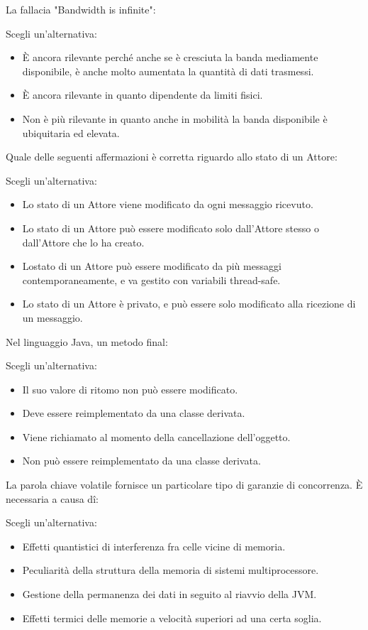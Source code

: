 \documentclass{article}
\begin{document}
La fallacia "Bandwidth is infinite":

Scegli un'alternativa: 

\begin{itemize}
	\item \checkmark È ancora rilevante perché anche se è cresciuta la banda mediamente disponibile, è anche molto aumentata la quantità di dati trasmessi.
	\item È ancora rilevante in quanto dipendente da limiti fisici.
	\item Non è più rilevante in quanto anche in mobilità la banda disponibile è ubiquitaria ed elevata.
\end{itemize}

Quale delle seguenti affermazioni è corretta riguardo allo stato di un Attore:

Scegli un'alternativa: 

\begin{itemize}
	\item Lo stato di un Attore viene modificato da ogni messaggio ricevuto.
	\item Lo stato di un Attore può essere modificato solo dall'Attore stesso o dall'Attore che lo ha creato.
	\item \checkmark Lostato di un Attore può essere modificato da più messaggi contemporaneamente, e va gestito con variabili thread-safe.
	\item Lo stato di un Attore è privato, e può essere solo modificato alla ricezione di un messaggio.
\end{itemize}

Nel linguaggio Java, un metodo final:

Scegli un'alternativa: 
\begin{itemize}
	\item Il suo valore di ritomo non può essere modificato.
	\item Deve essere reimplementato da una classe derivata.
	\item Viene richiamato al momento della cancellazione dell'oggetto.
	\item \checkmark Non può essere reimplementato da una classe derivata.
\end{itemize}

La parola chiave volatile fornisce un particolare tipo di garanzie di concorrenza. È necessaria a causa dî:

Scegli un'alternativa: 
\begin{itemize}
	\item Effetti quantistici di interferenza fra celle vicine di memoria.
	\item \checkmark Peculiarità della struttura della memoria di sistemi multiprocessore.
	\item Gestione della permanenza dei dati in seguito al riavvio della JVM.
	\item Effetti termici delle memorie a velocità superiori ad una certa soglia.
\end{itemize}
\end{document}
